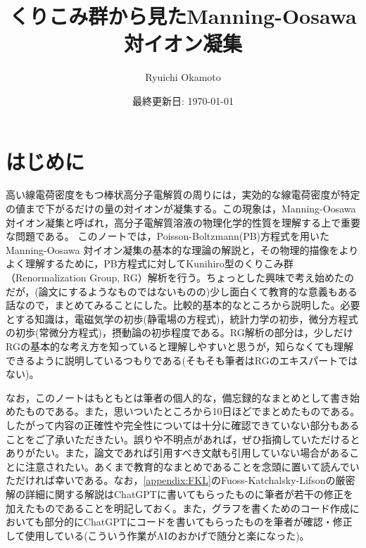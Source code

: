 \documentclass[11pt,a4paper]{ltjsarticle}
\title{くりこみ群から見たManning-Oosawa 対イオン凝集}
\author{Ryuichi Okamoto}
\date{最終更新日: \today}
\theoremstyle{definition}
\theoremstyle{remark}
\begin{document}
\maketitle
\tableofcontents


\section{はじめに}
高い線電荷密度をもつ棒状高分子電解質の周りには，実効的な線電荷密度が特定の値まで下がるだけの量の対イオンが凝集する。この現象は，Manning-Oosawa 対イオン凝集と呼ばれ\cite{Manning1969_I,Manning1969_II,Oosawa1971}，高分子電解質溶液の物理化学的性質を理解する上で重要な問題である。
このノートでは，Poisson-Boltzmann(PB)方程式を用いたManning-Oosawa 対イオン凝集の基本的な理論の解説と，その物理的描像をよりよく理解するために，PB方程式に対してKunihiro型のくりこみ群（Renormalization Group, RG）\cite{Kunihiro1995,Kunihiro1997}解析を行う。ちょっとした興味で考え始めたのだが，(論文にするようなものではないものの)少し面白くて教育的な意義もある話なので，まとめてみることにした。比較的基本的なところから説明した。必要とする知識は，電磁気学の初歩(静電場の方程式)，統計力学の初歩，微分方程式の初歩(常微分方程式)，摂動論の初歩程度である。RG解析の部分は，少しだけRGの基本的な考え方を知っていると理解しやすいと思うが，知らなくても理解できるように説明しているつもりである(そもそも筆者はRGのエキスパートではない)。

なお，このノートはもともとは筆者の個人的な，備忘録的なまとめとして書き始めたものである。また，思いついたところから10日ほどでまとめたものである。したがって内容の正確性や完全性については十分に確認できていない部分もあることをご了承いただきたい。誤りや不明点があれば，ぜひ指摘していただけるとありがたい。また，論文であれば引用すべき文献も引用していない場合があることに注意されたい。あくまで教育的なまとめであることを念頭に置いて読んでいただければ幸いである。なお，\ref{appendix:FKL}のFuoss-Katchalsky-Lifsonの厳密解の詳細に関する解説はChatGPTに書いてもらったものに筆者が若干の修正を加えたものであることを明記しておく。また，グラフを書くためのコード作成においても部分的にChatGPTにコードを書いてもらったものを筆者が確認・修正して使用している(こういう作業がAIのおかげで随分と楽になった)。
\end{document}
